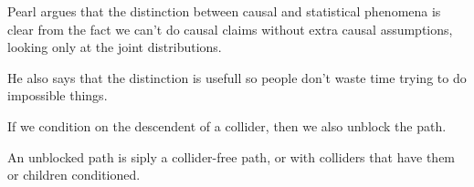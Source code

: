 Pearl argues that the distinction between causal and statistical phenomena is clear from the fact we can't do causal claims without extra causal assumptions, looking only at the joint distributions.

He also says that the distinction is usefull so people don't waste time trying to do impossible things.

If we condition on the descendent of a collider, then we also unblock the path.

An unblocked path is siply a collider-free path, or with colliders that have them or children conditioned.
